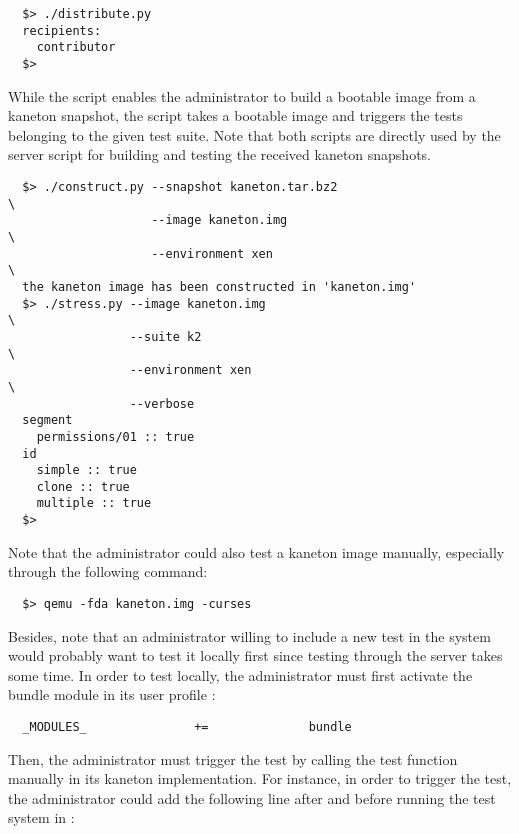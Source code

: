 \begin{verbatim}
  $> ./distribute.py
  recipients:
    contributor
  $>
\end{verbatim}

While the  script enables the administrator to build a
bootable image from a kaneton snapshot, the  script takes
a bootable image and triggers the tests belonging to the given test
suite. Note that both scripts are directly used by the server script for
building and testing the received kaneton snapshots.

\begin{verbatim}
  $> ./construct.py --snapshot kaneton.tar.bz2                          \
                    --image kaneton.img                                 \
                    --environment xen                                   \
  the kaneton image has been constructed in 'kaneton.img'
  $> ./stress.py --image kaneton.img                                    \
                 --suite k2                                             \
                 --environment xen                                      \
                 --verbose
  segment
    permissions/01 :: true
  id
    simple :: true
    clone :: true
    multiple :: true
  $> 
\end{verbatim}

Note that the administrator could also test a kaneton image manually,
especially through the following command:

\begin{verbatim}
  $> qemu -fda kaneton.img -curses
\end{verbatim}

Besides, note that an administrator willing to include a new test in the
system would probably want to test it locally first since testing through
the server takes some time. In order to test locally, the administrator
must first activate the bundle module in its user profile
:

\begin{verbatim}
  _MODULES_               +=              bundle
\end{verbatim}

Then, the administrator must trigger the test by calling the test function
manually in its kaneton implementation. For instance, in order to trigger
the  test, the administrator could add the
following line after \code{kernel\_initialize()} and before running the
test system in :

